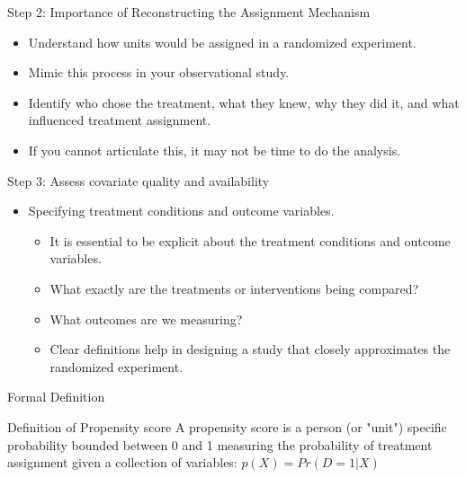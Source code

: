 \documentclass{beamer}
\begin{document}
\begin{frame}{Step 2: Importance of Reconstructing the Assignment Mechanism}
  \begin{itemize}
    \item Understand how units would be assigned in a randomized experiment.
    \item Mimic this process in your observational study.
    \item Identify who chose the treatment, what they knew, why they did it, and what influenced treatment assignment.
    \item If you cannot articulate this, it may not be time to do the analysis.
  \end{itemize}
\end{frame}


\begin{frame}{Step 3: Assess covariate quality and availability}
  \begin{itemize}

    \item Specifying treatment conditions and outcome variables.
    	\begin{itemize}
	\item It is essential to be explicit about the treatment conditions and outcome variables. 
	\item What exactly are the treatments or interventions being compared? 
	\item What outcomes are we measuring? 
	\item Clear definitions help in designing a study that closely approximates the randomized experiment.
	\end{itemize}
\end{itemize}

\end{frame}











\begin{frame}{Formal Definition}
	
	\begin{block}{Definition of Propensity score}
	A propensity score is a person (or "unit") specific probability bounded between 0 and 1 measuring the probability of treatment assignment given a collection of variables: $p(X)=Pr(D=1 | X)$
	\end{block}
	

\end{frame}
\end{document}
